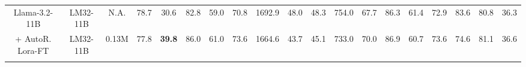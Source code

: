 \begin{table*}[ht]
{\begin{tabular}{ccc|cccccccccccccccc}
        \midrule
        Llama-3.2-11B & \hspace{-0.9em}LM32-11B & \hspace{-0.9em}N.A. & \hspace{-0.5em}78.7 & \hspace{-0.9em}30.6 & \hspace{-0.9em}82.8 & \hspace{-0.9em}59.0 & \hspace{-0.9em}70.8 & \hspace{-0.9em}1692.9 & \hspace{-0.9em}48.0 & \hspace{-0.9em}48.3 & \hspace{-0.9em}754.0 & \hspace{-0.9em}67.7 & \hspace{-0.9em}86.3 & \hspace{-0.9em}61.4 & \hspace{-0.9em}72.9 & \hspace{-0.9em}83.6 & \hspace{-0.9em}80.8 & \hspace{-0.9em}36.3 \\ 
        \rowcolor{color_lora_auto}
        + AutoR. Lora-FT & \hspace{-0.9em}LM32-11B & \hspace{-0.9em}0.13M & \hspace{-0.5em}77.8 & \hspace{-0.9em}\textbf{39.8} & \hspace{-0.9em}86.0 & \hspace{-0.9em}61.0 & \hspace{-0.9em}73.6 & \hspace{-0.9em}1664.6 & \hspace{-0.9em}43.7 & \hspace{-0.9em}45.1 & \hspace{-0.9em}733.0 & \hspace{-0.9em}70.0 & \hspace{-0.9em}86.9 & \hspace{-0.9em}60.7 & \hspace{-0.9em}73.6 & \hspace{-0.9em}74.6 & \hspace{-0.9em}81.1 & \hspace{-0.9em}36.6 \\ 
        \rowcolor{color_lora_lav}

\end{tabular}}
\end{table*}
